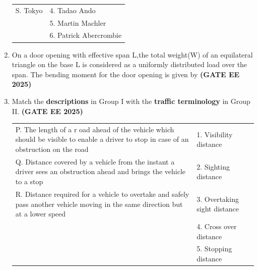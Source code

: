 \documentclass[journal,12pt,onecolumn]{IEEEtran}
\theoremstyle{remark}
\begin{document}
\begin{enumerate}
\begin{tabular}{p{}p{}}
S. Tokyo & 4. Tadao Ando\\
  & 5. Martin Machler\\
  & 6. Patrick Abercrombie\\
\end{tabular}
\begin{enumerate}
\end{enumerate}
\item  On a door opening with effective span L,the total weight(W) of an equilateral triangle on the base L is considered as a uniformly distributed load over the span. The bending moment for the door opening is given by \hfill \textbf{(GATE EE 2025)}
\begin{enumerate}
\end{enumerate}
\item  Match the \textbf{descriptions} in Group I with the \textbf{traffic terminology} in Group II. \hfill \textbf{(GATE EE 2025)}
\newline
\begin{tabular}{p{}p{}}
P. The length of a r
oad ahead of the vehicle which should be visible to enable a driver to stop in case of an obstruction on the road     & 1. Visibility distance \\
Q. Distance covered by a vehicle from the instant a driver sees an obstruction ahead and brings the vehicle to a stop     & 2. Sighting distance\\
R. Distance required for a vehicle to overtake and safely pass another vehicle moving in the same direction but at a lower speed & 3. Overtaking sight distance\\
  & 4. Cross over distance\\
   &5. Stopping distance\\
\end{tabular}
\begin{enumerate}

\end{enumerate}
\end{enumerate}
\end{document}

